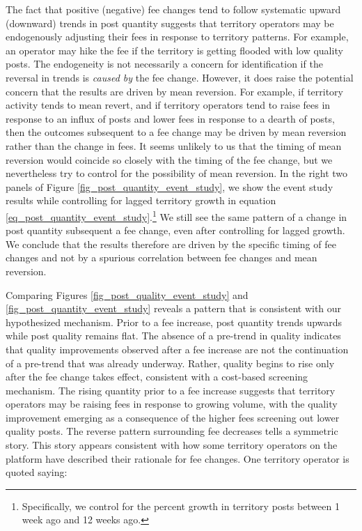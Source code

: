The fact that positive (negative) fee changes tend to follow systematic upward (downward) trends in post quantity suggests that territory operators may be endogenously adjusting their fees in response to territory patterns. For example, an operator may hike the fee if the territory is getting flooded with low quality posts. The endogeneity is not necessarily a concern for identification if the reversal in trends is \emph{caused by} the fee change. However, it does raise the potential concern that the results are driven by mean reversion. For example, if territory activity tends to mean revert, and if territory operators tend to raise fees in response to an influx of posts and lower fees in response to a dearth of posts, then the outcomes subsequent to a fee change may be driven by mean reversion rather than the change in fees. It seems unlikely to us that the timing of mean reversion would coincide so closely with the timing of the fee change, but we nevertheless try to control for the possibility of mean reversion. In the right two panels of Figure \ref{fig_post_quantity_event_study}, we show the event study results while controlling for lagged territory growth in equation \eqref{eq_post_quantity_event_study}.\footnote{Specifically, we control for the percent growth in territory posts between 1 week ago and 12 weeks ago.} We still see the same pattern of a change in post quantity subsequent a fee change, even after controlling for lagged growth. We conclude that the results therefore are driven by the specific timing of fee changes and not by a spurious correlation between fee changes and mean reversion.

Comparing Figures \ref{fig_post_quality_event_study} and \ref{fig_post_quantity_event_study} reveals a pattern that is consistent with our hypothesized mechanism. Prior to a fee increase, post quantity trends upwards while post quality remains flat. The absence of a pre-trend in quality indicates that quality improvements observed after a fee increase are not the continuation of a pre-trend that was already underway. Rather, quality begins to rise only after the fee change takes effect, consistent with a cost-based screening mechanism. The rising quantity prior to a fee increase suggests that territory operators may be raising fees in response to growing volume, with the quality improvement emerging as a consequence of the higher fees screening out lower quality posts. The reverse pattern surrounding fee decreases tells a symmetric story. This story appears consistent with how some territory operators on the platform have described their rationale for fee changes. One territory operator is quoted saying:

